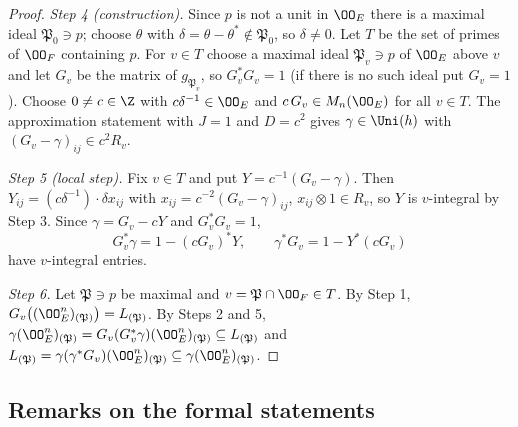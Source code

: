 \begin{proof}
\emph{Step 4 (construction).} Since $p$ is not a unit in $\OO_E$ there is a maximal ideal $\mathfrak P_0\ni p$; choose
$\theta$ with $\delta=\theta-\theta^*\notin\mathfrak P_0$, so $\delta\ne0$. Let $T$ be the set of primes of $\OO_F$ containing
$p$. For $v\in T$ choose a maximal ideal $\mathfrak P_v\ni p$ of $\OO_E$ above $v$ and let $G_v$ be the matrix of
$g_{\mathfrak P_v}$, so $G_v^*G_v=1$ (if there is no such ideal put $G_v=1$). Choose $0\ne c\in\Z$ with $c\delta^{-1}\in\OO_E$
and $c\,G_v\in M_n(\OO_E)$ for all $v\in T$. The approximation statement with $J=1$ and $D=c^2$ gives $\gamma\in\Uni(h)$ with
$(G_v-\gamma)_{ij}\in c^2R_v$.

\emph{Step 5 (local step).} Fix $v\in T$ and put $Y=c^{-1}(G_v-\gamma)$. Then $Y_{ij}=(c\delta^{-1})\cdot\delta x_{ij}$ with
$x_{ij}=c^{-2}(G_v-\gamma)_{ij}$, $x_{ij}\otimes1\in R_v$, so $Y$ is $v$-integral by Step 3. Since $\gamma=G_v-cY$ and
$G_v^*G_v=1$,
\[
G_v^*\gamma=1-(cG_v)^*Y,\qquad \gamma^*G_v=1-Y^*(cG_v)
\]
have $v$-integral entries.

\emph{Step 6.} Let $\mathfrak P\ni p$ be maximal and $v=\mathfrak P\cap\OO_F\in T$. By Step 1,
$G_v\bigl((\OO_E^n)_{(\mathfrak P)}\bigr)=L_{(\mathfrak P)}$. By Steps 2 and 5,
$\gamma(\OO_E^n)_{(\mathfrak P)}=G_v(G_v^*\gamma)(\OO_E^n)_{(\mathfrak P)}\subseteq L_{(\mathfrak P)}$ and
$L_{(\mathfrak P)}=\gamma(\gamma^*G_v)(\OO_E^n)_{(\mathfrak P)}\subseteq\gamma(\OO_E^n)_{(\mathfrak P)}$.
\end{proof}

\subsection{Remarks on the formal statements}\label{sec:pf:rows:remarks}

